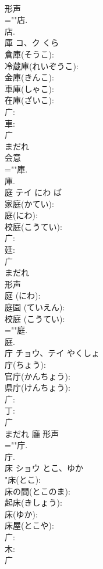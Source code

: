 \documentclass[8pt]{extreport}
\begin{document}
\begin{CJK}{UTF8}{min}
\\	形声 
\\	=""店.
\\	店.
\\	庫	コ、ク	くら		
\\	倉庫(そうこ): 
\\	冷蔵庫(れいぞうこ): 
\\	金庫(きんこ): 
\\	車庫(しゃこ): 
\\	在庫(ざいこ): 
\\	广: 
\\	車: 
\\	广	
\\	まだれ	
\\	会意 
\\	=""庫.
\\	庫.
\\	庭	テイ	にわ	ば	
\\	家庭(かてい): 
\\	庭(にわ): 
\\	校庭(こうてい): 
\\	广: 
\\	廷: 
\\	广	
\\	まだれ	
\\	形声 
\\	庭 (にわ): 
\\	庭園 (ていえん): 
\\	校庭 (こうてい): 
\\	=""庭.
\\	庭.
\\	庁	チョウ、テイ	やくしょ		
\\	庁(ちょう): 
\\	官庁(かんちょう): 
\\	県庁(けんちょう): 
\\	广: 
\\	丁: 
\\	广	
\\	まだれ	廳	形声 
\\	=""庁.
\\	庁.
\\	床	ショウ	とこ、ゆか		
\\	"床(とこ): 
\\	床の間(とこのま): 
\\	起床(きしょう): 
\\	床(ゆか): 
\\	床屋(とこや): 
\\	广: 
\\	木: 
\\	广	

\end{CJK}
\end{document}
